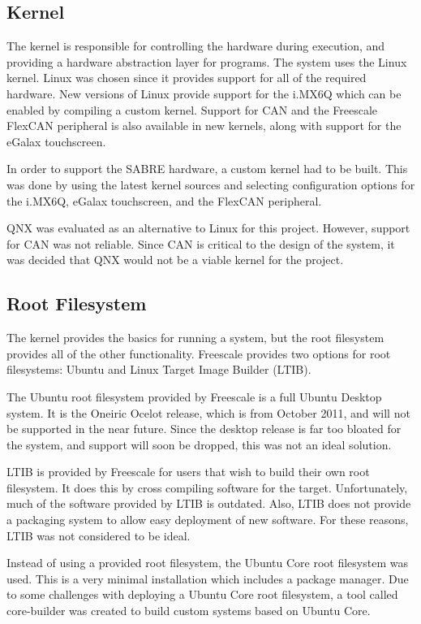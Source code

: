 \documentclass[ece]{uw-wkrpt}
\begin{document}
\subsection{Kernel}

The kernel is responsible for controlling the hardware during execution, and
providing a hardware abstraction layer for programs. The system uses the Linux
kernel. Linux was chosen since it provides support for all of the required
hardware. New versions of Linux provide support for the i.MX6Q which can be
enabled by compiling a custom kernel. Support for CAN and the Freescale FlexCAN
peripheral is also available in new kernels, along with support for the
eGalax touchscreen.

In order to support the SABRE hardware, a custom kernel had to be built. This
was done by using the latest kernel sources and selecting configuration options
for the i.MX6Q, eGalax touchscreen, and the FlexCAN peripheral.

QNX was evaluated as an alternative to Linux for this project. However, support
for CAN was not reliable. Since CAN is critical to the design of the system, it
was decided that QNX would not be a viable kernel for the project.

\subsection{Root Filesystem}

The kernel provides the basics for running a system, but the root filesystem
provides all of the other functionality. Freescale provides two options for root
filesystems: Ubuntu and Linux Target Image Builder (LTIB).

The Ubuntu root filesystem provided by Freescale is a full Ubuntu Desktop
system. It is the Oneiric Ocelot release, which is from October 2011, and will
not be supported in the near future. Since the desktop release is far too bloated
for the system, and support will soon be dropped, this was not an ideal
solution.

LTIB is provided by Freescale for users that wish to build their own root filesystem. It does
this by cross compiling software for the target. Unfortunately, much of the
software provided by LTIB is outdated. Also, LTIB does not provide a
packaging system to allow easy deployment of new software. For these reasons,
LTIB was not considered to be ideal.

Instead of using a provided root filesystem, the Ubuntu Core root filesystem was
used. This is a very minimal installation which includes a package manager. Due
to some challenges with deploying a Ubuntu Core root filesystem, a tool called
core-builder was created to build custom systems based on Ubuntu Core.
\end{document}
